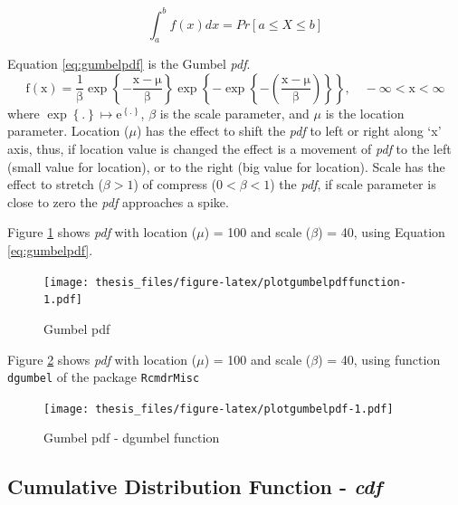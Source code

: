 \documentclass[12pt,oneside]{reedthesis}
\begin{document}
\[
\int_a^b f(x)dx = Pr[a \leq X \leq b]
\]

Equation \eqref{eq:gumbelpdf} is the Gumbel \emph{pdf}.
\begin{equation}
  \mathrm{
          f(x)=\frac{1}{\beta}
          \exp\left\{
            -\frac{x-\mu}{\beta}
          \right\}
          \exp\left\{
            -\exp\left\{
              -\left(
                \frac{x-\mu}{\beta}
              \right)
            \right\}
          \right\},
          \quad -\infty < x < \infty
         }
  \label{eq:gumbelpdf}
\end{equation}
where \(\exp\left\{.\right\} \mapsto \mathrm{e}^{\left\{.\right\}}\), \(\beta\) is the scale parameter, and \(\mu\) is the location parameter. Location (\(\mu\)) has the effect to shift the \emph{pdf} to left or right along `x' axis, thus, if location value is changed the effect is a movement of \emph{pdf} to the left (small value for location), or to the right (big value for location). Scale has the effect to stretch (\(\beta > 1\)) of compress (\(0 < \beta< 1\)) the \emph{pdf}, if scale parameter is close to zero the \emph{pdf} approaches a spike.

Figure \ref{fig:plotgumbelpdffunction} shows \emph{pdf} with location (\(\mu\)) = 100 and scale (\(\beta\)) = 40, using Equation \eqref{eq:gumbelpdf}.

\footnotesize
\begin{figure}
\centering
\texttt{[image: thesis\_files/figure-latex/plotgumbelpdffunction-1.pdf]}
\caption{\label{fig:plotgumbelpdffunction}Gumbel pdf}
\end{figure}
\normalsize

Figure \ref{fig:plotgumbelpdf} shows \emph{pdf} with location (\(\mu\)) = 100 and scale (\(\beta\)) = 40, using function \texttt{dgumbel} of the package \texttt{RcmdrMisc}

\footnotesize
\begin{figure}
\centering
\texttt{[image: thesis\_files/figure-latex/plotgumbelpdf-1.pdf]}
\caption{\label{fig:plotgumbelpdf}Gumbel pdf - dgumbel function}
\end{figure}
\normalsize

\hypertarget{cumulative-distribution-function---cdf}{%
\subsection{\texorpdfstring{Cumulative Distribution Function - \emph{cdf}}{Cumulative Distribution Function - cdf}}\label{cumulative-distribution-function---cdf}}
\end{document}
